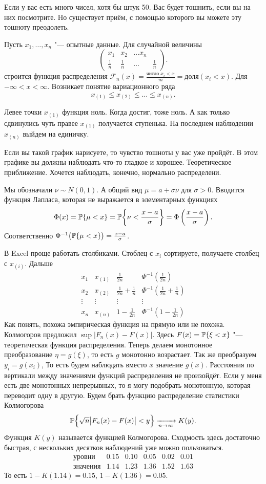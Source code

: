 Если у вас есть много чисел, хотя бы штук 50. Вас будет тошнить, если вы на них посмотрите. Но существует приём, с помощью которого вы можете эту тошноту преодолеть.

Пусть $x_1,\dots, x_n$ "--- опытные данные. Для случайной величины
\[
  \begin{pmatrix}
 x_1 & x_2 & \dots x_n\\
 \frac1n & \frac 1n & \dots & \frac1n
\end{pmatrix}.
\]
строится функция распределения $\mathcal F_n(x) = \frac{\text{число }x_i<x}m = \text{доля}(x_i<x)$. Для $-\infty<x<\infty$. Возникает понятие вариационного ряда
\[
  x_{(1)}\le x_{(2)}\le \dots \le x_{(n)}.
\]

Левее точки $x_{(1)}$ функция ноль. Когда достиг, тоже ноль. А как только сдвинулись чуть правее $x_{(1)}$ получается ступенька. На последнем наблюдении $x_{(n)}$ выйдем на единичку.

Если вы такой график нарисуете, то чувство тошноты у вас уже пройдёт. В этом графике вы должны наблюдать что-то гладкое и хорошее. Теоретическое приближение. Хочется наблюдать, конечно, нормально распределени.

Мы обозначали $\nu\sim N(0,1)$. А общий вид $\mu = a + \sigma\nu$  для $\sigma>0$. Вводится функция Лапласа, которая не выражается в элементарных функциях
\[
  \Phi(x) = \P\{\mu < x\} = \P\bigg\{\nu < \frac{x-a}\sigma\bigg\} = \Phi\left( \frac{x-a}\sigma \right).
\]
Соответственно $\Phi^{-1}\big(\P\{\mu < x\}\big) = \frac{x-a}\sigma$.

В Excel проще работать столбиками. Стоблец с $x_i$ сортируете, получаете столбец с $x_{(i)}$. Дальше
\[
  \begin{matrix}
 x_1 & x_{(1)} & \frac1{2n} & \Phi^{-1}\left( \frac1{2n} \right)\\
 x_2 & x_{(2)} & \frac1{2n} + \frac 1n & \Phi^{-1}\left( \frac1{2n} + \frac1n \right)\\
 \vdots & \vdots &\vdots & \vdots \\
 x_n & x_{(n)} & 1 - \frac1{2n} & \Phi^{-1}\left( 1 - \frac1{2n}\right)
\end{matrix}
\]
Как понять, похожа эмпирическая функция на прямую или не похожа. Колмогоров предложил $\sup \big| F_n(x) - F(x)\big|$. Здесь $F(x) = \P\{\xi < x\}$ "--- теоретическая функция распределения. Теперь делаем монотонное преобразование $\eta = g(\xi)$, то есть $g$ монотонно возрастает. Так же преобразуем $y_i = g(x_i)$, То есть будем наблюдать вместо $x$ значение $g(x)$. Расстояния по вертикали между значениями функций распределения не произойдёт. Если у меня есть две монотонных непрерывных, то я могу подобрать монотонную, которая переводит одну в другую. Будем брать функцию распределение статистики Колмогорова
\[
  \P\Big\{\sqrt n \big|F_n(x) - F(x)\big| < y\Big\} \te K(y).
\]
Функция $K(y)$ называется функцией Колмогорова. Сходмость здесь достаточно быстрая, с нескольких десятков наблюдений уже можно пользоваться.
\[
  \begin{matrix}
\text{уровни}&  0.15 & 0.10 & 0.05 & 0.02 & 0.01\\
\text{значения}&  1.14 & 1.23 & 1.36 & 1.52 & 1.63
\end{matrix}
\]
То есть $1 - K(1.14) = 0.15$, $1-K(1.36) = 0.05$.


